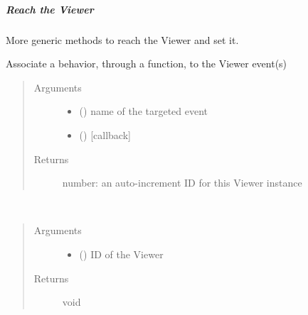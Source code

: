 \documentclass[a4paper,12pt,english]{sphinxmanual}
\begin{document}
\subparagraph{Reach the Viewer}
\label{\detokenize{viewer/parameters:reach-the-viewer}}
More generic methods to reach the Viewer and set it.


\begin{fulllineitems}
\label{\detokenize{viewer/parameters:BIMDataViewer.on}}
Associate a behavior, through a function, to the Viewer event(s)
\begin{quote}\begin{description}
\item[{Arguments}] \leavevmode\begin{itemize}
\item {} 
 () \textendash{} name of the targeted event

\item {} 
 () \textendash{}  {[}callback{]}

\end{itemize}

\item[{Returns}] \leavevmode
number: an auto-increment ID for this Viewer instance

\end{description}\end{quote}

\end{fulllineitems}



\begin{fulllineitems}
\label{\detokenize{viewer/parameters:BIMDataViewer.off}}~\begin{quote}\begin{description}
\item[{Arguments}] \leavevmode\begin{itemize}
\item {} 
 () \textendash{} ID of the Viewer

\end{itemize}

\item[{Returns}] \leavevmode
void

\end{description}\end{quote}

\end{fulllineitems}
\end{document}
